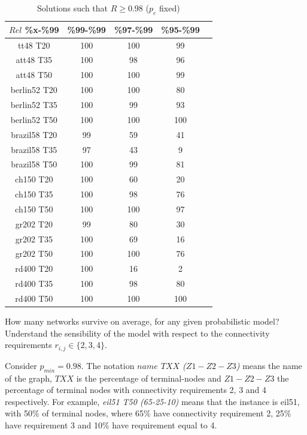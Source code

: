 \begin{table}
\caption{Solutions such that $R \geq 0.98$ ($p_e$ fixed)} %
\centering  %
\begin{tabular}{|c|c|c|c|c|} %
\hline	$Rel$ \%x-\%99  &	\%99-\%99 & \%97-\%99 & \%95-\%99\\
\hline	tt48 T20	&	100	&	100	&	99	\\
\hline	att48 T35	&	100	&	98	&	96	\\
\hline	att48 T50	&	100	&	100	&	99	\\
\hline	berlin52 T20	&	100	&	100	&	80	\\
\hline	berlin52 T35	&	100	&	99	&	93	\\
\hline	berlin52 T50	&	100	&	100	&	100	\\
\hline	brazil58 T20	&	99	&	59	&	41	\\
\hline	brazil58 T35	&	97	&	43	&	9	\\
\hline	brazil58 T50	&	100	&	99	&	81	\\
\hline	ch150 T20	&	100	&	60	&	20	\\
\hline	ch150 T35	&	100	&	98	&	76	\\
\hline	ch150 T50	&	100	&	100	&	97	\\
\hline	gr202 T20	&	99	&	80	&	30	\\
\hline	gr202 T35	&	100	&	69	&	16	\\
\hline	gr202 T50	&	100	&	100	&	76	\\
\hline	rd400 T20	&	100	&	16	&	2	\\
\hline	rd400 T35	&	100	&	98	&	80	\\
\hline	rd400 T50	&	100	&	100	&	100	\\
\hline
\end{tabular}
\label{answer2b} %
\end{table}

\begin{question}
How many networks survive on average, for any given probabilistic model? 
Understand the sensibility of the model with respect to the connectivity requirements 
$r_{i,j} \in \{2,3,4\}$.
\end{question}

Consider $p_{min}=0.98$. The notation \emph{$name$ $TXX$ ($Z1-Z2-Z3$)} 
means the name of the graph, $TXX$ is the percentage of terminal-nodes and $Z1-Z2-Z3$ the percentage of 
terminal nodes with connectivity requirements 2, 3 and 4 respectively. 
For example, \emph{eil51 T50 (65-25-10)} means that the instance is eil51, with 50\% of terminal nodes, 
where 65\% have connectivity requirement 2, 25\% have requirement 3 and 10\% have requirement equal to 4.

